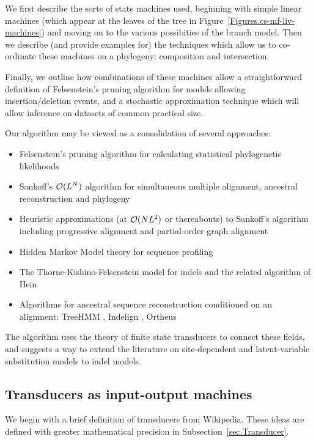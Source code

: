 \documentclass{article}
\newcommand{\secref}[1]{Subsection~\ref{sec.#1}}
\newcommand{\figref}[1]{Figure~\ref{Figures.#1}}
\begin{document}
We first describe the sorts of state machines used, beginning
 with simple linear machines
 (which appear at the leaves of the tree in \figref{cs-mf-liv-machines}) 
and moving on to the various possibities of the branch model. 
Then we describe (and provide examples for) the techniques which allow us to 
co-ordinate these machines on a phylogeny: composition and intersection. 

Finally, we outline how combinations of these machines allow a straightforward definition
of Felsenstein's pruning algorithm for models allowing insertion/deletion events,
and a stochastic approximation technique which will allow inference on datasets
of common practical size.  


Our algorithm may be viewed as a consolidation of several approaches:
\begin{itemize}
\item Felsenstein's pruning algorithm for calculating statistical phylogenetic likelihoods \cite{Felsenstein81}
\item Sankoff's ${\cal O}(L^N)$ algorithm for simultaneous multiple alignment, ancestral reconstruction and phylogeny \cite{SankoffCedergren83}
\item Heuristic approximations (at ${\cal O}(NL^2)$ or thereabouts) to Sankoff's algorithm including progressive alignment \cite{HigginsSharp89} and partial-order graph alignment \cite{LeeGrassoSharlow2002}
\item Hidden Markov Model theory for sequence profiling \cite{Durbin98}
\item The Thorne-Kishino-Felsenstein model for indels \cite{ThorneEtal91}
 and the related algorithm of Hein \cite{Hein2001}
\item Algorithms for ancestral sequence reconstruction conditioned on an alignment:
 TreeHMM \cite{DialloEtAl2007}, Indelign \cite{KimSinha2007}, Ortheus \cite{PatenEtAl2008}
\end{itemize}

The algorithm uses the theory of finite state transducers to connect these fields,
and suggests a way to extend the literature on
site-dependent and latent-variable substitution models \cite{Yang94,Bruno96,YangEtAl2000,HolmesRubin2002b}
to indel models.


\subsection{Transducers as input-output machines}

We begin with a brief definition of transducers from Wikipedia.  
These ideas are defined with greater mathematical precision in \secref{Transducer}.
\end{document}
